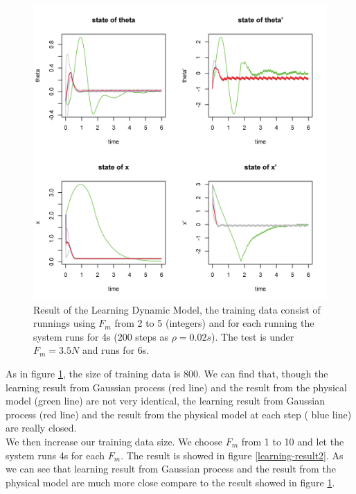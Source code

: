 \documentclass[11pt,twoside,a4paper]{article}
\begin{document}
\begin{figure}[!]
\centering
\includegraphics[width=14cm]{learning-result1.png}
\caption{Result of the Learning Dynamic Model, the training data
  consist of runnings using $F_m$ from 2 to 5 (integers) and for each
  running the system runs for 4s (200 steps as $\rho = 0.02s$). The
  test is under $F_m = 3.5N$ and runs for 6s.}
\label{learning-result1}
\end{figure}

As in figure \ref{learning-result1}, the size of training data is
800. We can find that, though the learning result from Gaussian
process ({\color{red}red line}) and the result from the physical model
({\color{green}green line}) are not very identical, the learning
result from Gaussian process ({\color{red}red line}) and the result
from the physical model at each step ({\color{blue} blue line}) are
really closed.\\

We then increase our training data size. We choose $F_m$ from 1 to 10
and let the system runs 4s for each $F_m$. The result is showed in
figure \ref{learning-result2}. As we can see that {\color{red}learning result} from
Gaussian process and the {\color{green}result} from the physical model
are much more close compare to the result showed in figure \ref{learning-result1}.\\
\end{document}
